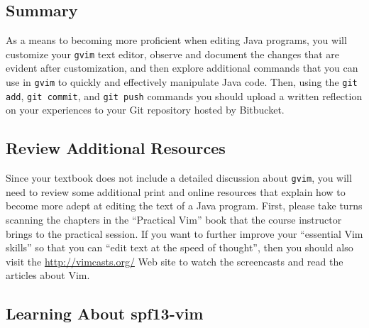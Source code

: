 



\vspace*{-.2in}
\subsection*{Summary}
\vspace*{-.05in}

As a means to becoming more proficient when editing Java programs, you will customize your {\tt gvim} text editor,
observe and document the changes that are evident after customization, and then explore additional commands that you can
use in {\tt gvim} to quickly and effectively manipulate Java code.  Then, using the {\tt git add}, {\tt git commit}, and
{\tt git push} commands you should upload a written reflection on your experiences to your Git repository hosted by
Bitbucket.  

\vspace*{-.15in}
\subsection*{Review Additional Resources}
\vspace*{-.05in}

Since your textbook does not include a detailed discussion about {\tt gvim}, you will need to review some additional print
and online resources that explain how to become more adept at editing the text of a Java program.  First, please take
turns scanning the chapters in the ``Practical Vim'' book that the course instructor brings to the practical session. If
you want to further improve your ``essential Vim skills'' so that you can ``edit text at the speed of thought'', then
you should also visit the \url{http://vimcasts.org/} Web site to watch the screencasts and read the articles about Vim.

\vspace*{-.15in}
\subsection*{Learning About spf13-vim} 
\vspace*{-.05in}

